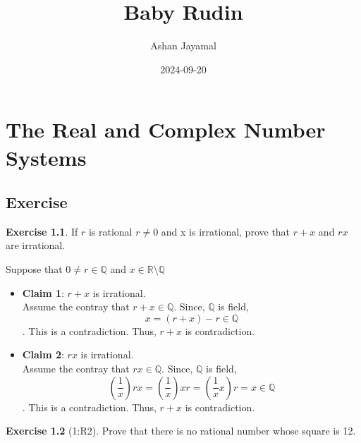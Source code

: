 \documentclass[
]{book}
\title{Baby Rudin}
\author{Ashan Jayamal}
\date{2024-09-20}
\theoremstyle{definition}
\theoremstyle{definition}
\theoremstyle{definition}
\newtheorem{exercise}{Exercise}[chapter]
\theoremstyle{definition}
\theoremstyle{remark}
\begin{document}
\maketitle

{
\setcounter{tocdepth}{1}
\tableofcontents
}
\chapter{The Real and Complex Number Systems}\label{the-real-and-complex-number-systems}

\section{Exercise}\label{exercise}

\begin{exercise}
\protect\hypertarget{exr:unnamed-chunk-1}{}\label{exr:unnamed-chunk-1}If \(r\) is rational \(r\neq 0\) and x is irrational, prove that \(r + x\) and \(rx\) are irrational.
\end{exercise}

Suppose that \(0 \neq r \in \mathbb{Q}\) and \(x\in \mathbb{R}\setminus \mathbb{Q}\)

\begin{itemize}
\item
  \textbf{Claim 1}: \(r+x\) is irrational.\\
  Assume the contray that \(r+x\in \mathbb{Q}\). Since, \(\mathbb{Q}\) is field,
  \[x=(r+x)-r\in \mathbb{Q}\]. This is a contradiction. Thus, \(r+x\) is contradiction.
\item
  \textbf{Claim 2}: \(rx\) is irrational.\\
  Assume the contray that \(rx\in \mathbb{Q}\). Since, \(\mathbb{Q}\) is field,
  \[\left(\frac{1}{x}\right)rx=\left(\frac{1}{x}\right)xr=\left(\frac{1}{x}x\right)r=x\in \mathbb{Q}\]. This is a contradiction. Thus, \(r+x\) is contradiction.
\end{itemize}

\begin{exercise}[1:R2]
\protect\hypertarget{exr:unnamed-chunk-2}{}\label{exr:unnamed-chunk-2}Prove that there is no rational number whose square is 12.
\end{exercise}
\end{document}
